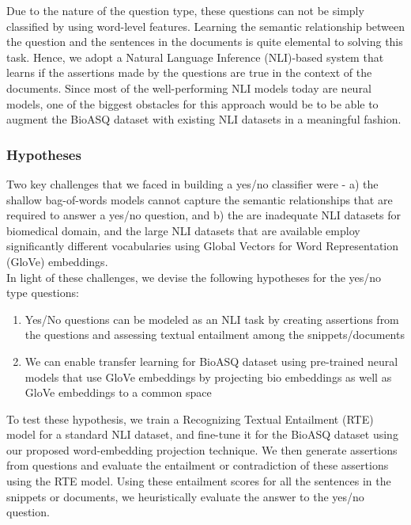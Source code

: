 Due to the nature of the question type, these questions can not be simply classified by using word-level features. Learning the semantic relationship between the question and the sentences in the documents is quite elemental to solving this task. Hence, we adopt a Natural Language Inference (NLI)-based system that learns if the assertions made by the questions are true in the context of the documents. Since most of the well-performing NLI models today are neural models, one of the biggest obstacles for this approach would be to be able to augment the BioASQ dataset with existing NLI datasets in a meaningful fashion. 

\subsubsection{Hypotheses}

Two key challenges that we faced in building a yes/no classifier were - a) the shallow bag-of-words models cannot capture the semantic relationships that are required to answer a yes/no question, and b) the are inadequate NLI datasets for biomedical domain, and the large NLI datasets that are available employ significantly different vocabularies using Global Vectors for Word Representation (GloVe) embeddings. \\ 

In light of these challenges, we devise the following hypotheses for the yes/no type questions:

\begin{enumerate}
    \item Yes/No questions can be modeled as an NLI task by creating assertions from the questions and assessing textual entailment among the snippets/documents
    \item We can enable transfer learning for BioASQ dataset using pre-trained neural models that use GloVe embeddings by projecting bio embeddings as well as GloVe embeddings to a common space
\end{enumerate}

To test these hypothesis, we train a Recognizing Textual Entailment (RTE) model for a standard NLI dataset, and fine-tune it for the BioASQ dataset using our proposed word-embedding projection technique. We then generate assertions from questions and evaluate the entailment or contradiction of these assertions using the RTE model. Using these entailment scores for all the sentences in the snippets or documents, we heuristically evaluate the answer to the yes/no question. 


